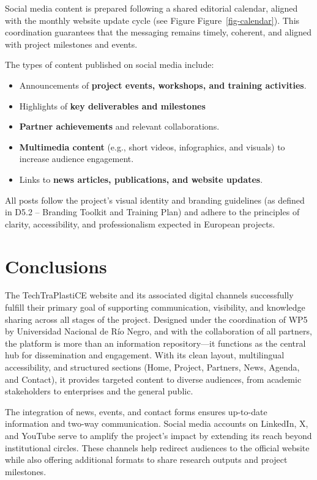\documentclass[
  12pt,
  oneside]{book}
\providecommand{\tightlist}{%
  \setlength{\itemsep}{0pt}\setlength{\parskip}{0pt}}
\begin{document}
Social media content is prepared following a shared editorial calendar,
aligned with the monthly website update cycle (see Figure
Figure~\ref{fig-calendar}). This coordination guarantees that the
messaging remains timely, coherent, and aligned with project milestones
and events.

The types of content published on social media include:

\begin{itemize}
\tightlist
\item
  Announcements of \textbf{project events, workshops, and training
  activities}.
\item
  Highlights of \textbf{key deliverables and milestones}
\item
  \textbf{Partner achievements} and relevant collaborations.
\item
  \textbf{Multimedia content} (e.g., short videos, infographics, and
  visuals) to increase audience engagement.
\item
  Links to \textbf{news articles, publications, and website updates}.
\end{itemize}

All posts follow the project's visual identity and branding guidelines
(as defined in D5.2 -- Branding Toolkit and Training Plan) and adhere to
the principles of clarity, accessibility, and professionalism expected
in European projects.

\chapter{Conclusions}\label{conclusions}

The TechTraPlastiCE website and its associated digital channels
successfully fulfill their primary goal of supporting communication,
visibility, and knowledge sharing across all stages of the project.
Designed under the coordination of WP5 by Universidad Nacional de Río
Negro, and with the collaboration of all partners, the platform is more
than an information repository---it functions as the central hub for
dissemination and engagement. With its clean layout, multilingual
accessibility, and structured sections (Home, Project, Partners, News,
Agenda, and Contact), it provides targeted content to diverse audiences,
from academic stakeholders to enterprises and the general public.

The integration of news, events, and contact forms ensures up-to-date
information and two-way communication. Social media accounts on
LinkedIn, X, and YouTube serve to amplify the project's impact by
extending its reach beyond institutional circles. These channels help
redirect audiences to the official website while also offering
additional formats to share research outputs and project milestones.
\end{document}
